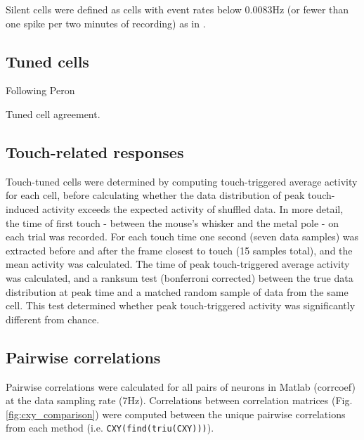 \documentclass[a4paper,10pt,twocolumn]{article}
\begin{document}
Silent cells were defined as cells with event rates below 0.0083Hz (or fewer than one spike per two minutes of recording) as in \citep{OConnor2010-hd}.

\subsection{Tuned cells}
Following Peron

Tuned cell agreement.

\subsection{Touch-related responses}
Touch-tuned cells were determined by computing touch-triggered average activity for each cell, before calculating whether the data distribution of peak touch-induced activity exceeds the expected activity of shuffled data. In more detail, the time of first touch - between the mouse's whisker and the metal pole - on each trial was recorded. For each touch time one second (seven data samples) was extracted before and after the frame closest to touch (15 samples total), and the mean activity was calculated. The time of peak touch-triggered average activity was calculated, and a ranksum test (bonferroni corrected) between the true data distribution at peak time and a matched random sample of data from the same cell. This test determined whether peak touch-triggered activity was significantly different from chance. 


\subsection{Pairwise correlations}
Pairwise correlations were calculated for all pairs of neurons in Matlab (corrcoef) at the data sampling rate (7Hz). Correlations between correlation matrices (Fig. \ref{fig:cxy_comparison}) were computed between the unique pairwise correlations from each method (i.e. {\tt CXY(find(triu(CXY)))}).
\end{document}
